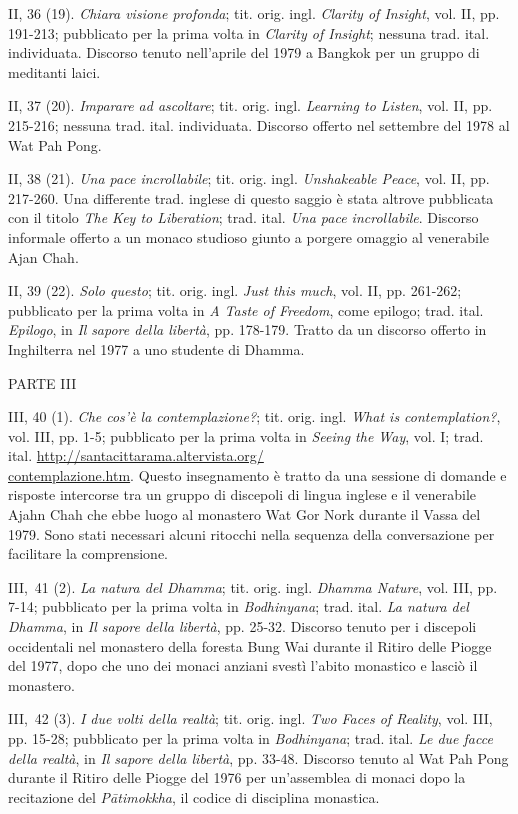 II, 36 (19). \emph{Chiara visione profonda}; tit. orig. ingl.
\emph{Clarity of Insight}, vol. II, pp. 191-213; pubblicato per la prima
volta in \emph{Clarity of Insight}; nessuna trad. ital. individuata.
Discorso tenuto nell'aprile del 1979 a Bangkok per un gruppo di
meditanti laici.

II, 37 (20). \emph{Imparare ad ascoltare}; tit. orig. ingl.
\emph{Learning to Listen}, vol. II, pp. 215-216; nessuna trad. ital.
individuata. Discorso offerto nel settembre del 1978 al Wat Pah Pong.

II, 38 (21). \emph{Una pace incrollabile}; tit. orig. ingl.
\emph{Unshakeable Peace}, vol. II, pp. 217-260. Una differente trad.
inglese di questo saggio è stata altrove pubblicata con il titolo
\emph{The Key to Liberation}; trad. ital. \emph{Una pace incrollabile}.
Discorso informale offerto a un monaco studioso giunto a porgere omaggio
al venerabile Ajan Chah.

II, 39 (22). \emph{Solo questo}; tit. orig. ingl. \emph{Just this much},
vol. II, pp. 261-262; pubblicato per la prima volta in \emph{A Taste of
Freedom}, come epilogo; trad. ital. \emph{Epilogo}, in \emph{Il}
\emph{sapore della libertà}, pp. 178-179. Tratto da un discorso offerto
in Inghilterra nel 1977 a uno studente di Dhamma.

PARTE III

III, 40 (1). \emph{Che cos'è la contemplazione?}; tit. orig. ingl.
\emph{What is contemplation?}, vol. III, pp. 1-5; pubblicato per la
prima volta in \emph{Seeing the Way}, vol. I; trad. ital.
\href{http://santacittarama.altervista.org/contemplazione.htm}{http://santacittarama.altervista.org/\\
contemplazione.htm}. Questo insegnamento è tratto da una sessione di
domande e risposte intercorse tra un gruppo di discepoli di lingua
inglese e il venerabile Ajahn Chah che ebbe luogo al monastero Wat Gor
Nork durante il Vassa del 1979. Sono stati necessari alcuni ritocchi
nella sequenza della conversazione per facilitare la comprensione.

III,~41 (2). \emph{La natura del Dhamma}; tit. orig. ingl. \emph{Dhamma
Nature}, vol. III, pp. 7-14; pubblicato per la prima volta in
\emph{Bodhinyana}; trad. ital. \emph{La natura del Dhamma}, in \emph{Il
sapore della libertà}, pp. 25-32. Discorso tenuto per i discepoli
occidentali nel monastero della foresta Bung Wai durante il Ritiro delle
Piogge del 1977, dopo che uno dei monaci anziani svestì l'abito
monastico e lasciò il monastero.

III,~42 (3). \emph{I due volti della realtà}; tit. orig. ingl. \emph{Two
Faces of Reality}, vol. III, pp. 15-28; pubblicato per la prima volta in
\emph{Bodhinyana}; trad. ital. \emph{Le due facce della realtà}, in
\emph{Il sapore della libertà}, pp. 33-48. Discorso tenuto al Wat Pah
Pong durante il Ritiro delle Piogge del 1976 per un'assemblea di monaci
dopo la recitazione del \emph{Pātimokkha}, il codice di disciplina
monastica.

